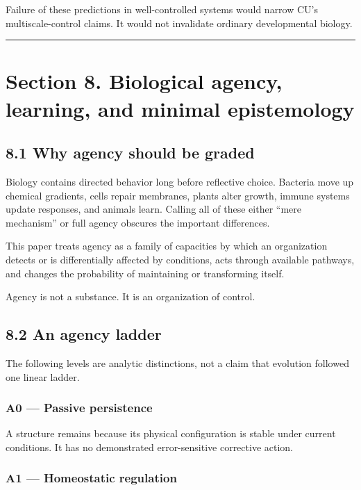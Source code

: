 \documentclass[
  11pt,
]{article}
\begin{document}
Failure of these predictions in well-controlled systems would narrow
CU's multiscale-control claims. It would not invalidate ordinary
developmental biology.

\begin{center}\rule{0.5\linewidth}{0.5pt}\end{center}

\section{Section 8. Biological agency, learning, and minimal
epistemology}\label{section-8.-biological-agency-learning-and-minimal-epistemology}

\subsection{8.1 Why agency should be
graded}\label{why-agency-should-be-graded}

Biology contains directed behavior long before reflective choice.
Bacteria move up chemical gradients, cells repair membranes, plants
alter growth, immune systems update responses, and animals learn.
Calling all of these either ``mere mechanism'' or full agency obscures
the important differences.

This paper treats agency as a family of capacities by which an
organization detects or is differentially affected by conditions, acts
through available pathways, and changes the probability of maintaining
or transforming itself.

Agency is not a substance. It is an organization of control.

\subsection{8.2 An agency ladder}\label{an-agency-ladder}

The following levels are analytic distinctions, not a claim that
evolution followed one linear ladder.

\subsubsection{A0 --- Passive persistence}\label{a0-passive-persistence}

A structure remains because its physical configuration is stable under
current conditions. It has no demonstrated error-sensitive corrective
action.

\subsubsection{A1 --- Homeostatic
regulation}\label{a1-homeostatic-regulation}
\end{document}
